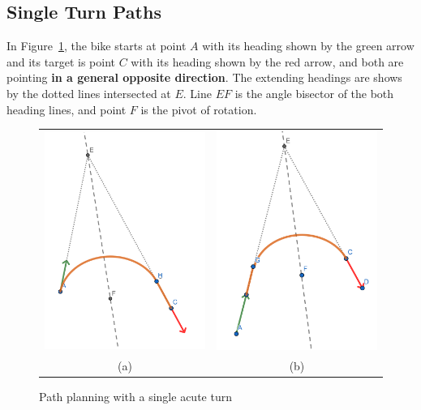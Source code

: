 \documentclass{article}
\begin{document}
\subsection*{Single Turn Paths}
In Figure~\ref{fig:path1turnacute}, the bike starts at point $A$ with its heading shown by
the green arrow and its target is point $C$ with its heading shown by the red arrow,
and both are pointing \textbf{in a general opposite direction}.
The extending headings are shows by the dotted lines intersected at $E$.
Line $EF$ is the angle bisector of the both heading lines, and point $F$ is the
pivot of rotation.

\begin{figure}[hbt]
  \begin{tabular}{cc}
    \includegraphics[width=6cm]{screenshots/single-acute-turn-rot-trans.png} & 
    \includegraphics[width=6cm]{screenshots/single-acute-turn-trans-rot.png}       \\
    (a)                                                                      & (b) \\
  \end{tabular}
  \caption{Path planning with a single acute turn}
  \label{fig:path1turnacute}
\end{figure}
\end{document}
